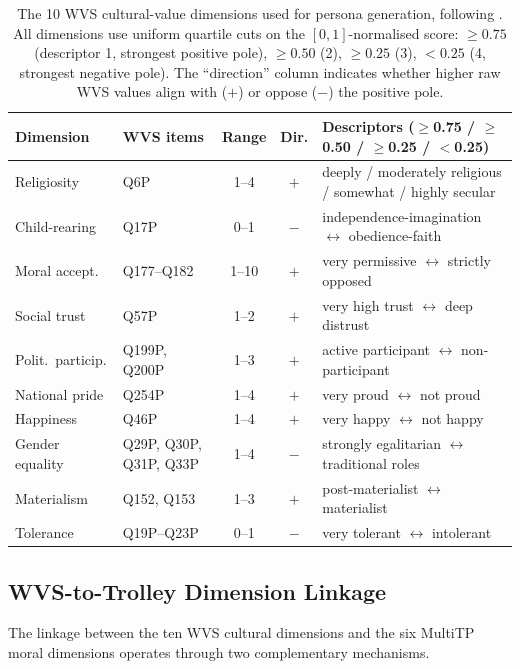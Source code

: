 \documentclass{article}
\begin{document}
\begin{table}[H]\centering\small
\caption{The 10 WVS cultural-value dimensions used for persona generation, following \citet{greco2026personas}. All dimensions use uniform quartile cuts on the $[0,1]$-normalised score: $\geq 0.75$ (descriptor 1, strongest positive pole), $\geq 0.50$ (2), $\geq 0.25$ (3), $< 0.25$ (4, strongest negative pole). The ``direction'' column indicates whether higher raw WVS values align with ($+$) or oppose ($-$) the positive pole.}
\label{tab:wvs_thresholds}
\setlength{\tabcolsep}{3pt}\scriptsize
\begin{tabular}{llccl}\toprule
Dimension & WVS items & Range & Dir. & Descriptors ($\geq$0.75 / $\geq$0.50 / $\geq$0.25 / $<$0.25) \\\midrule
Religiosity & Q6P & 1--4 & $+$ & deeply / moderately religious / somewhat / highly secular \\
Child-rearing & Q17P & 0--1 & $-$ & independence-imagination $\leftrightarrow$ obedience-faith \\
Moral accept. & Q177--Q182 & 1--10 & $+$ & very permissive $\leftrightarrow$ strictly opposed \\
Social trust & Q57P & 1--2 & $+$ & very high trust $\leftrightarrow$ deep distrust \\
Polit.\ particip. & Q199P, Q200P & 1--3 & $+$ & active participant $\leftrightarrow$ non-participant \\
National pride & Q254P & 1--4 & $+$ & very proud $\leftrightarrow$ not proud \\
Happiness & Q46P & 1--4 & $+$ & very happy $\leftrightarrow$ not happy \\
Gender equality & Q29P, Q30P, Q31P, Q33P & 1--4 & $-$ & strongly egalitarian $\leftrightarrow$ traditional roles \\
Materialism & Q152, Q153 & 1--3 & $+$ & post-materialist $\leftrightarrow$ materialist \\
Tolerance & Q19P--Q23P & 0--1 & $-$ & very tolerant $\leftrightarrow$ intolerant \\
\bottomrule
\end{tabular}
\end{table}

\subsection{WVS-to-Trolley Dimension Linkage}
\label{app:wvs_linkage}

The linkage between the ten WVS cultural dimensions and the six MultiTP moral dimensions operates through two complementary mechanisms.
\end{document}
